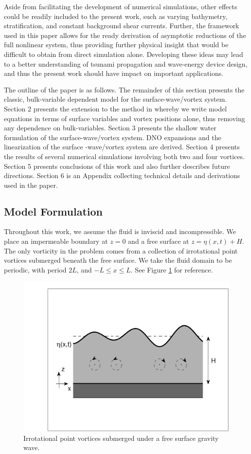 \documentclass[a4paper,11pt]{article}
\begin{document}
Aside from facilitating the development of numerical simulations, other effects could be readily included to the present work, such as varying bathymetry, stratification, and constant background shear currents.  Further, the framework used in this paper allows for the ready derivation of asymptotic reductions of the full nonlinear system, thus providing further physical insight that would be difficult to obtain from direct simulation alone. Developing these ideas may lead to a better understanding of tsunami propagation and wave-energy device design, and thus the present work should have impact on important applications.    

The outline of the paper is as follows.  The remainder of this section presents the classic, bulk-variable dependent model for the surface-wave/vortex system.  Section 2 presents the extension to the method in \cite{afm} whereby we write model equations in terms of surface variables and vortex positions alone, thus removing any dependence on bulk-variables.  Section 3 presents the shallow water formulation of the surface-wave/vortex system.  DNO expansions and the linearization of the surface -wave/vortex system are derived.  Section 4 presents the results of several numerical simulations involving both two and four vortices.  Section 5 presents conclusions of this work and also further describes future directions.  Section 6 is an Appendix collecting technical details and derivations used in the paper.  
  
\subsection{Model Formulation}
Throughout this work, we assume the fluid is inviscid and incompressible.  We place an impermeable boundary at $z=0$ and a free surface at $z=\eta(x,t)+H$.  The only vorticity in the problem comes from a collection of irrotational point vortices submerged beneath the free surface.  We take the fluid domain to be periodic, with period $2L$, and $-L\leq x \leq L$.  See Figure \ref{fig:vortex} for reference.  
\begin{figure}
\centering
\includegraphics[width=.5\textwidth]{CurtisKalisch_Vortices}
\caption{\small Irrotational point vortices submerged under a free surface gravity wave.}
\label{fig:vortex}
\end{figure}
\end{document}
